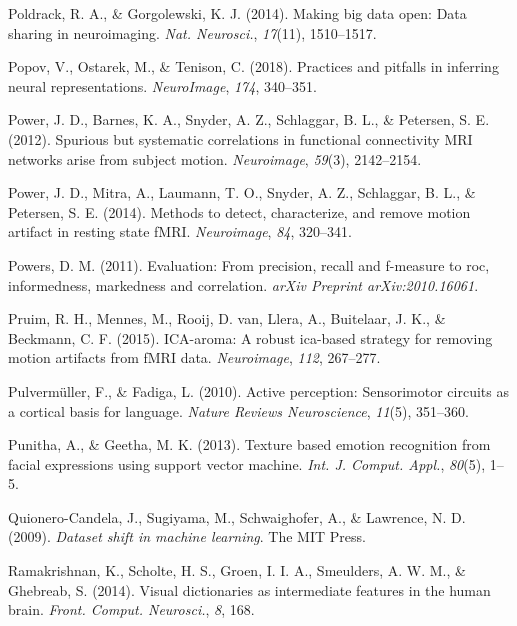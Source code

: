\documentclass[12pt,american,a4paper,oneside,]{memoir} %
\begin{document}
\leavevmode\hypertarget{ref-Poldrack2014-ov}{}%
Poldrack, R. A., \& Gorgolewski, K. J. (2014). Making big data open: Data sharing in neuroimaging. \emph{Nat. Neurosci.}, \emph{17}(11), 1510--1517.

\leavevmode\hypertarget{ref-popov2018practices}{}%
Popov, V., Ostarek, M., \& Tenison, C. (2018). Practices and pitfalls in inferring neural representations. \emph{NeuroImage}, \emph{174}, 340--351.

\leavevmode\hypertarget{ref-Power2012-kt}{}%
Power, J. D., Barnes, K. A., Snyder, A. Z., Schlaggar, B. L., \& Petersen, S. E. (2012). Spurious but systematic correlations in functional connectivity MRI networks arise from subject motion. \emph{Neuroimage}, \emph{59}(3), 2142--2154.

\leavevmode\hypertarget{ref-Power2014-gh}{}%
Power, J. D., Mitra, A., Laumann, T. O., Snyder, A. Z., Schlaggar, B. L., \& Petersen, S. E. (2014). Methods to detect, characterize, and remove motion artifact in resting state fMRI. \emph{Neuroimage}, \emph{84}, 320--341.

\leavevmode\hypertarget{ref-powers2020evaluation}{}%
Powers, D. M. (2011). Evaluation: From precision, recall and f-measure to roc, informedness, markedness and correlation. \emph{arXiv Preprint arXiv:2010.16061}.

\leavevmode\hypertarget{ref-pruim2015ica}{}%
Pruim, R. H., Mennes, M., Rooij, D. van, Llera, A., Buitelaar, J. K., \& Beckmann, C. F. (2015). ICA-aroma: A robust ica-based strategy for removing motion artifacts from fMRI data. \emph{Neuroimage}, \emph{112}, 267--277.

\leavevmode\hypertarget{ref-pulvermuller2010active}{}%
Pulvermüller, F., \& Fadiga, L. (2010). Active perception: Sensorimotor circuits as a cortical basis for language. \emph{Nature Reviews Neuroscience}, \emph{11}(5), 351--360.

\leavevmode\hypertarget{ref-Punitha2013-jy}{}%
Punitha, A., \& Geetha, M. K. (2013). Texture based emotion recognition from facial expressions using support vector machine. \emph{Int. J. Comput. Appl.}, \emph{80}(5), 1--5.

\leavevmode\hypertarget{ref-Quionero-Candela2009-ge}{}%
Quionero-Candela, J., Sugiyama, M., Schwaighofer, A., \& Lawrence, N. D. (2009). \emph{Dataset shift in machine learning}. The MIT Press.

\leavevmode\hypertarget{ref-Ramakrishnan2014-ki}{}%
Ramakrishnan, K., Scholte, H. S., Groen, I. I. A., Smeulders, A. W. M., \& Ghebreab, S. (2014). Visual dictionaries as intermediate features in the human brain. \emph{Front. Comput. Neurosci.}, \emph{8}, 168.
\end{document}
